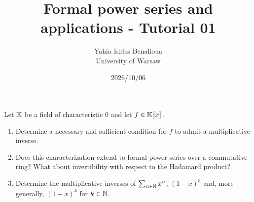 

\title{Formal power series and applications - Tutorial 01}
\date{2026/10/06}
\author{Yahia Idriss Benalioua \\ \small University of Warsaw}



\maketitle

\begin{exercise}\label{ex:inv}
    Let $\mathbb K$ be a field of characteristic 0 and let $f \in \mathbb K[\![x]\!]$.
    \begin{enumerate}
        \item Determine a necessary and sufficient condition for $f$
            to admit a multiplicative inverse.
        \item Does this characterization extend to formal power
            series over a commutative ring? What about invertibility
            with respect to the Hadamard product?
        \item Determine the multiplicative inverses of
            $\sum_{n \in \mathbb N} x^n$, $(1-x)^3$ and, more generally,
            $(1-x)^k$ for $k \in \mathbb N$.
    \end{enumerate}
\end{exercise}
